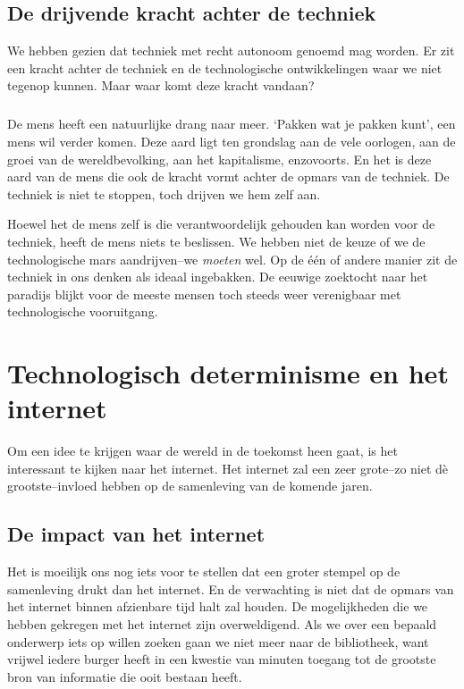 \documentclass[11pt]{report}
\begin{document}
\section{De drijvende kracht achter de techniek}

We hebben gezien dat techniek met recht autonoom genoemd mag worden. Er zit een kracht achter de techniek en de technologische ontwikkelingen waar we niet tegenop kunnen. Maar waar komt deze kracht vandaan?

\paragraph{}

De mens heeft een natuurlijke drang naar meer. `Pakken wat je pakken kunt', een mens wil verder komen. Deze aard ligt ten grondslag aan de vele oorlogen, aan de groei van de wereldbevolking, aan het kapitalisme, enzovoorts. En het is deze aard van de mens die ook de kracht vormt achter de opmars van de techniek. De techniek is niet te stoppen, toch drijven we hem zelf aan.

Hoewel het de mens zelf is die verantwoordelijk gehouden kan worden voor de techniek, heeft de mens niets te beslissen. We hebben niet de keuze of we de technologische mars aandrijven--we \emph{moeten} wel. Op de \'e\'en of andere manier zit de techniek in ons denken als ideaal ingebakken. De eeuwige zoektocht naar het paradijs blijkt voor de meeste mensen toch steeds weer verenigbaar met technologische vooruitgang.



\chapter{Technologisch determinisme en het internet}

Om een idee te krijgen waar de wereld in de toekomst heen gaat, is het interessant te kijken naar het internet. Het internet zal een zeer grote--zo niet d\`e grootste--invloed hebben op de samenleving van de komende jaren.


\section{De impact van het internet}

Het is moeilijk ons nog iets voor te stellen dat een groter stempel op de samenleving drukt dan het internet. En de verwachting is niet dat de opmars van het internet binnen afzienbare tijd halt zal houden. De mogelijkheden die we hebben gekregen met het internet zijn overweldigend. Als we over een bepaald onderwerp iets op willen zoeken gaan we niet meer naar de bibliotheek, want vrijwel iedere burger heeft in een kwestie van minuten toegang tot de grootste bron van informatie die ooit bestaan heeft.
\end{document}
